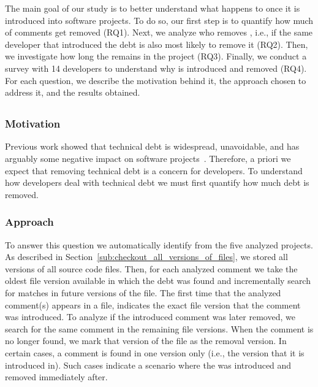 
The main goal of our study is to better understand what happens to \SATD once it is introduced into software projects. To do so, our first step is to quantify how much of \SATD comments get removed (RQ1). Next, we analyze who removes \SATD, i.e., if the same developer that introduced the debt is also most likely to remove it (RQ2). Then, we investigate how long the \SATD remains in the project (RQ3). Finally, we conduct a survey with 14 developers to understand why \SATD is introduced and removed (RQ4). For each question, we describe the motivation behind it, the approach chosen to address it, and the results obtained.



\subsection*{\rqi}
\subsubsection*{Motivation} Previous work showed that technical debt is widespread, unavoidable, and has arguably some negative impact on software projects~\cite{Lim2012Software}. Therefore, a priori we expect that removing technical debt is a concern for developers. To understand how developers deal with  technical debt we must first quantify how much debt is removed. 


\subsubsection*{Approach} To answer this question we automatically identify \SATD from the five analyzed projects. As described in Section~\ref{sub:checkout_all_versions_of_files}, we stored all versions of all source code files. Then, for each analyzed \SATD comment we take the oldest file version available in which the debt was found and incrementally search for matches in future versions of the file. The first time that the analyzed \SATD comment(s) appears in a file, indicates the exact file version that the \SATD comment was introduced. To analyze if the introduced \SATD comment was later removed, we search for the same comment in the remaining file versions. When the comment is no longer found, we mark that version of the file as the removal version. In certain cases, a \SATD comment is found in one version only (i.e., the version that it is introduced in). Such cases indicate a scenario where the \SATD was introduced and removed immediately after. 

